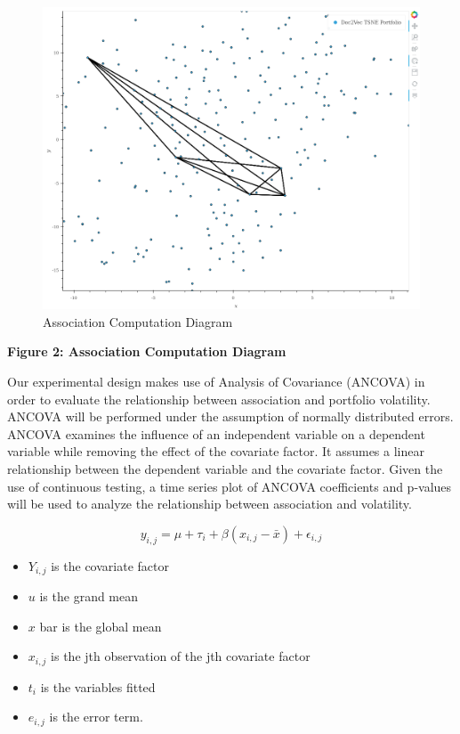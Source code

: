 \documentclass[11pt]{article}
\makeatletter
\def\maxwidth{\ifdim\Gin@nat@width>\linewidth\linewidth
    \else\Gin@nat@width\fi}
\let\Oldincludegraphics\includegraphics
\renewcommand{\includegraphics}[1]{\Oldincludegraphics[width=.8\maxwidth]{#1}}
\providecommand{\tightlist}{%
      \setlength{\itemsep}{0pt}\setlength{\parskip}{0pt}}
\makeatother
\begin{document}
\begin{figure}
\centering
\includegraphics{../experiments/media/Association Computation Diagram.png}
\caption{Association Computation Diagram}
\end{figure}

\textbf{Figure 2: Association Computation Diagram}

Our experimental design makes use of Analysis of Covariance (ANCOVA) in
order to evaluate the relationship between association and portfolio
volatility. ANCOVA will be performed under the assumption of normally
distributed errors. ANCOVA examines the influence of an independent
variable on a dependent variable while removing the effect of the
covariate factor. It assumes a linear relationship between the dependent
variable and the covariate factor. Given the use of continuous testing,
a time series plot of ANCOVA coefficients and p-values will be used to
analyze the relationship between association and volatility.

\[y_{i, j} = \mu + \tau_{i} + \beta (x_{i,j} - \bar{x}) + \epsilon_{i, j} \]

\begin{itemize}
\tightlist
\item
  \(Y_{i, j}\) is the covariate factor
\item
  \(u\) is the grand mean
\item
  \(x\) bar is the global mean\\
\item
  \(x_{i, j}\) is the jth observation of the jth covariate factor\\
\item
  \(t_{i}\) is the variables fitted\\
\item
  \(e_{i, j}\) is the error term.
\end{itemize}
\end{document}

